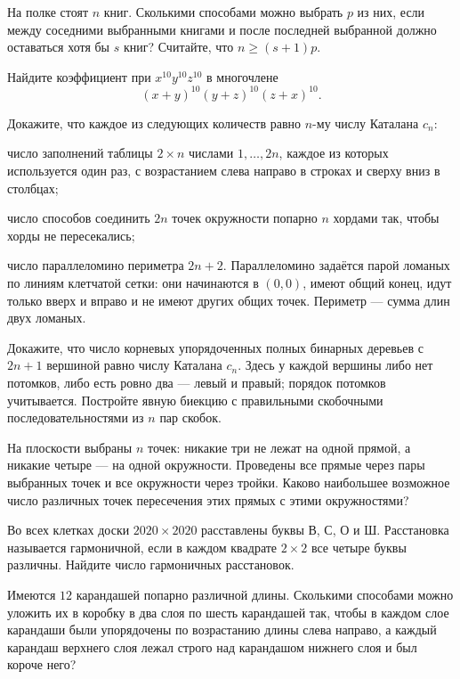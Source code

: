 \begin{problems}
\item На полке стоят $n$ книг. Сколькими способами можно выбрать $p$ из них, если между соседними выбранными книгами и после последней выбранной должно оставаться хотя бы $s$ книг? Считайте, что $n\ge(s+1)p$.

\item Найдите коэффициент при $x^{10}y^{10}z^{10}$ в многочлене
\[
(x+y)^{10}(y+z)^{10}(z+x)^{10}.
\]

\item Докажите, что каждое из следующих количеств равно $n$-му числу Каталана $c_n$:
\begin{parts}
  \item число заполнений таблицы $2\times n$ числами $1,\ldots,2n$, каждое из которых используется один раз, с возрастанием слева направо в строках и сверху вниз в столбцах;
  \item число способов соединить $2n$ точек окружности попарно $n$ хордами так, чтобы хорды не пересекались;
  \item число параллеломино периметра $2n+2$. Параллеломино задаётся парой ломаных по линиям клетчатой сетки: они начинаются в $(0,0)$, имеют общий конец, идут только вверх и вправо и не имеют других общих точек. Периметр --- сумма длин двух ломаных.
\end{parts}

\item Докажите, что число корневых упорядоченных полных бинарных деревьев с $2n+1$ вершиной равно числу Каталана $c_n$. Здесь у каждой вершины либо нет потомков, либо есть ровно два --- левый и правый; порядок потомков учитывается. Постройте явную биекцию с правильными скобочными последовательностями из $n$ пар скобок.

\item На плоскости выбраны $n$ точек: никакие три не лежат на одной прямой, а никакие четыре --- на одной окружности. Проведены все прямые через пары выбранных точек и все окружности через тройки. Каково наибольшее возможное число различных точек пересечения этих прямых с этими окружностями?

\item Во всех клетках доски $2020\times2020$ расставлены буквы В, С, О и Ш. Расстановка называется гармоничной, если в каждом квадрате $2\times2$ все четыре буквы различны. Найдите число гармоничных расстановок.

\item Имеются $12$ карандашей попарно различной длины. Сколькими способами можно уложить их в коробку в два слоя по шесть карандашей так, чтобы в каждом слое карандаши были упорядочены по возрастанию длины слева направо, а каждый карандаш верхнего слоя лежал строго над карандашом нижнего слоя и был короче него?


\end{problems}
